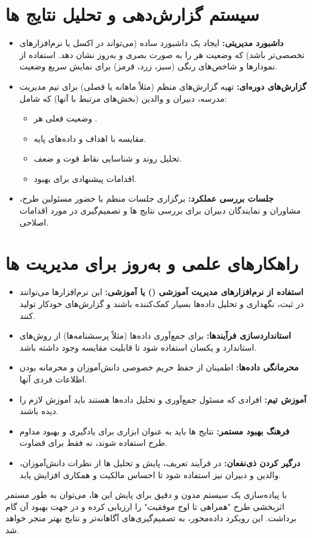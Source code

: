\documentclass[12pt,a4paper]{article}
\begin{document}
\section{سیستم گزارش‌دهی و تحلیل نتایج  ها}
\begin{itemize}
    \item \textbf{داشبورد مدیریتی:} ایجاد یک داشبورد ساده (می‌تواند در اکسل یا نرم‌افزارهای تخصصی‌تر باشد) که وضعیت هر  را به صورت بصری و به‌روز نشان دهد. استفاده از نمودارها و شاخص‌های رنگی (سبز، زرد، قرمز) برای نمایش سریع وضعیت.
    \item \textbf{گزارش‌های دوره‌ای:} تهیه گزارش‌های منظم (مثلاً ماهانه یا فصلی) برای تیم مدیریت مدرسه، دبیران و والدین (بخش‌های مرتبط با آنها) که شامل:
    \begin{itemize}
        \item وضعیت فعلی هر .
        \item مقایسه با اهداف و داده‌های پایه.
        \item تحلیل روند و شناسایی نقاط قوت و ضعف.
        \item اقدامات پیشنهادی برای بهبود.
    \end{itemize}
    \item \textbf{جلسات بررسی عملکرد:} برگزاری جلسات منظم با حضور مسئولین طرح، مشاوران و نمایندگان دبیران برای بررسی نتایج ها و تصمیم‌گیری در مورد اقدامات اصلاحی.
\end{itemize}

\section{راهکارهای علمی و به‌روز برای مدیریت ها}
\begin{itemize}
    \item \textbf{استفاده از نرم‌افزارهای مدیریت آموزشی () یا  آموزشی:} این نرم‌افزارها می‌توانند در ثبت، نگهداری و تحلیل داده‌ها بسیار کمک‌کننده باشند و گزارش‌های خودکار تولید کنند.
    \item \textbf{استانداردسازی فرآیندها:} برای جمع‌آوری داده‌ها (مثلاً پرسشنامه‌ها) از روش‌های استاندارد و یکسان استفاده شود تا قابلیت مقایسه وجود داشته باشد.
    \item \textbf{محرمانگی داده‌ها:} اطمینان از حفظ حریم خصوصی دانش‌آموزان و محرمانه بودن اطلاعات فردی آنها.
    \item \textbf{آموزش تیم:} افرادی که مسئول جمع‌آوری و تحلیل داده‌ها هستند باید آموزش لازم را دیده باشند.
    \item \textbf{فرهنگ بهبود مستمر:} نتایج ها باید به عنوان ابزاری برای یادگیری و بهبود مداوم طرح استفاده شوند، نه فقط برای قضاوت.
    \item \textbf{درگیر کردن ذی‌نفعان:} در فرآیند تعریف، پایش و تحلیل ها از نظرات دانش‌آموزان، والدین و دبیران نیز استفاده شود تا احساس مالکیت و همکاری افزایش یابد.
\end{itemize}

با پیاده‌سازی یک سیستم مدون و دقیق برای پایش این ها، می‌توان به طور مستمر اثربخشی طرح "همراهی تا اوج موفقیت" را ارزیابی کرده و در جهت بهبود آن گام برداشت. این رویکرد داده‌محور، به تصمیم‌گیری‌های آگاهانه‌تر و نتایج بهتر منجر خواهد شد.
\end{document}
